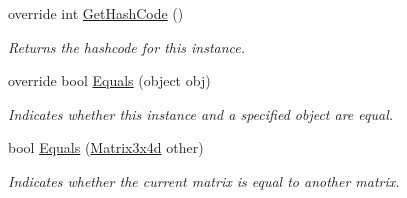 \begin{DoxyCompactItemize}
override int \hyperlink{struct_open_t_k_1_1_matrix3x4d_ac0fd0c2a6906a9c07618787604766697}{Get\-Hash\-Code} ()
\begin{DoxyCompactList}\small\item\em Returns the hashcode for this instance. \end{DoxyCompactList}\item 
override bool \hyperlink{struct_open_t_k_1_1_matrix3x4d_a94868f88863e8049abc227ab51435116}{Equals} (object obj)
\begin{DoxyCompactList}\small\item\em Indicates whether this instance and a specified object are equal. \end{DoxyCompactList}\item 
bool \hyperlink{struct_open_t_k_1_1_matrix3x4d_af12593d2e47c663f7cac31b6ca74d82f}{Equals} (\hyperlink{struct_open_t_k_1_1_matrix3x4d}{Matrix3x4d} other)
\begin{DoxyCompactList}\small\item\em Indicates whether the current matrix is equal to another matrix. \end{DoxyCompactList}\end{DoxyCompactItemize}
